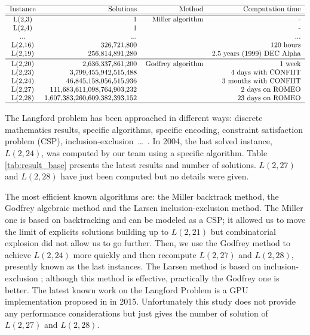 \begin{table}[t!]
\centering
\[
\begin{tabular}{c r r r}
  \hline
  Instance & Solutions & Method & Computation time\\
  \hline
  \hline
  L(2,3) & 1 &  Miller algorithm & - \\
  L(2,4) & 1 & & - \\ 
  ... & ... & & ...  \\
  L(2,16) & 326,721,800 & & 120 hours  \\
  L(2,19) & 256,814,891,280 & & 2.5 years (1999) DEC Alpha \\
  \hline
  \hline
  L(2,20) & 2,636,337,861,200 & Godfrey algorithm & 1 week \\
  L(2,23) & 3,799,455,942,515,488 & &  4 days with CONFIIT \\
  L(2,24) & 46,845,158,056,515,936 & & 3 months with CONFIIT \\
  L(2,27) & 111,683,611,098,764,903,232 & & 2 days on ROMEO \\
  L(2,28) & 1,607,383,260,609,382,393,152 & & 23 days on ROMEO \\
  \hline
\end{tabular}
\]
\caption{Solutions and time for Langford problem using different methods}
\label{tab:result_base}
\end{table}

The Langford problem has been approached in different ways: discrete mathematics results, specific algorithms, specific encoding, constraint satisfaction problem (CSP), inclusion-exclusion~\ldots~\cite{Mil00,apes-26,Smi00,larsen2009counting}.
In 2004, the last solved instance, $L(2,24)$, was computed by our team \cite{CReSTIC-711} using a specific algorithm. 
Table \ref{tab:result_base} presents the latest results and number of solutions. 
$L(2,27)$ and $L(2,28)$ have just been computed but no details were given. 

The most efficient known algorithms are: the Miller backtrack method, the Godfrey algebraic method and the Larsen inclusion-exclusion method.
The Miller one is based on backtracking and can be modeled as a CSP; it allowed us to move the limit of explicits solutions building up to $L(2,21)$ but combinatorial explosion did not allow us to go further. 
Then, we use the Godfrey method to achieve $L(2,24)$ more quickly and then recompute $L(2,27)$ and $L(2,28)$, presently known as the last instances.
The Larsen method is based on inclusion-exclusion \cite{larsen2009counting}; although this method is effective, practically the Godfrey one is better. 
The latest known work on the Langford Problem is a GPU implementation proposed in \cite{ASS_LGF} in 2015. Unfortunately this study does not provide any performance considerations but just gives the number of solution of $L(2,27)$ and $L(2,28)$.

